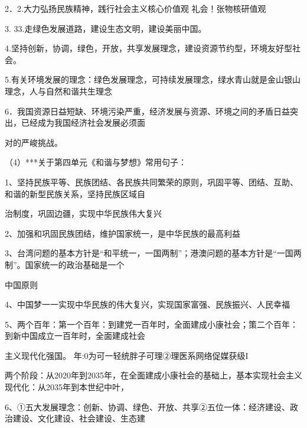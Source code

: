 \documentclass[lang=cn,11pt]{elegantbook}
\newcommand{\daofasym}[1]{{\daofasymbolfont #1}}
\newcommand{\daofasym}[1]{#1}
\begin{document}
2．2.大力弘扬民族精神，践行社会主义核心价值观 礼会！张物核研值观\par

3. 33.走绿色发展道路，建设生态文明，建设美丽中国。\par

4.坚持创新，协调，绿色，开放，共享发展理念，建设资源节约型，环境友好型社会。\par

5.有关环境发展的理念：绿色发展理念，可持续发展理念，绿水青山就是金山银山理念，人与自然和谐共生理念\par

6．我国资源日益短缺、环境污染严重，经济发展与资源、环境之间的矛盾日益突出，已经成为我国经济社会发展必须面\par

对的严峻挑战。\par

（4）***关于第四单元《和谐与梦想》常用句子：\par

1、坚持民族平等、民族团结、各民族共同繁荣的原则，巩固平等、团结、互助、和谐的新型民族关系，坚持民族区域自\par

治制度，巩固边疆，实现中华民族伟大复兴\par

2、加强和巩固民族团结，维护国家统一，是中华民族的最高利益\par

3、台湾问题的基本方针是“和平统一，一国两制”；港澳问题的基本方针是“一国两制”。国家统一的政治基础是一个\par

中国原则\par

4、中国梦一一实现中华民族的伟大复兴，实现国家富强、民族振兴、人民幸福\par

5、两个百年：第一个百年：到建党一百年时，全面建成小康社会；策二个百年：到新中国成立一百年时，全面建成社会\par

主义现代化强国。 年:0为可一轻统胖子可理\daofasym{②}理医系网络促媒获级I\par

两个阶段：从2020年到2035年，在全面建成小康社会的基础上，基本实现社会主义现代化：从2035年到本世纪中叶，\par

6、\daofasym{①}五大发展理念：创新、协调、绿色、开放、共享\daofasym{②}五位一体：经济建设、政治建设、文化建设、社会建设、生态建\par
\end{document}
